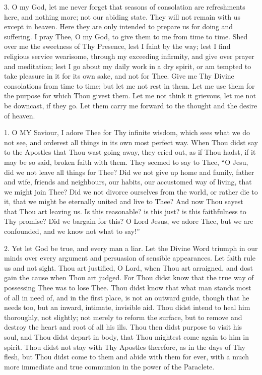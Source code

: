 3. O my God, let me never forget
that seasons of consolation are refreshments here, and nothing more; not
our abiding state. They will not remain with us except in heaven. Here
they are only intended to prepare us for doing and suffering. I pray
Thee, O my God, to give them to me from time to time. Shed over me
the sweetness of Thy Presence, lest I faint by the way; lest I find
religious service wearisome, through my exceeding infirmity, and give
over prayer and meditation; lest I go about my daily work in a dry
spirit, or am tempted to take pleasure in it for its own sake, and not
for Thee. Give me Thy Divine consolations from time to time; but let me
not rest in them. Let me use them for the purpose for which Thou givest
them. Let me not think it grievous, let me not be downcast, if they go.
Let them carry me forward to the thought and the desire of heaven.


1. O MY
Saviour, I adore Thee for Thy infinite wisdom, which sees what we do not
see, and orderest all things in its own most perfect way. When Thou
didst say to the Apostles that Thou wast going away, they cried out, as
if Thou hadst, if it may be so said, broken faith with them. They seemed
to say to Thee, ``O Jesu, did we not leave all things for Thee? Did we
not give up home and family, father and wife, friends and neighbours,
our habits, our accustomed way of living, that we might join Thee? Did we not divorce ourselves from the world, or rather die to it, that
we might be eternally united and live to Thee? And now Thou sayest that
Thou art leaving us. Is this reasonable? is this just? is this
faithfulness to Thy promise? Did we bargain for this? O Lord Jesus, we
adore Thee, but we are confounded, and we know not what to say!''

2. Yet let God be true, and
every man a liar. Let the Divine Word triumph in our minds over every
argument and persuasion of sensible appearances. Let faith rule us and
not sight. Thou art justified, O Lord, when Thou art arraigned, and dost
gain the cause when Thou art judged. For Thou didst know that the true
way of possessing Thee was to lose Thee. Thou didst know that what man
stands most of all in need of, and in the first place, is not an outward
guide, though that he needs too, but an inward, intimate, invisible aid.
Thou didst intend to heal him thoroughly, not slightly; not merely to
reform the surface, but to remove and destroy the heart and root of all
his ills. Thou then didst purpose to visit his soul, and Thou didst
depart in body, that Thou mightest come again to him in spirit. Thou
didst not stay with Thy Apostles therefore, as in the days of Thy flesh,
but Thou didst come to them and abide with them for ever, with a much
more immediate and true communion in the power of the Paraclete.

